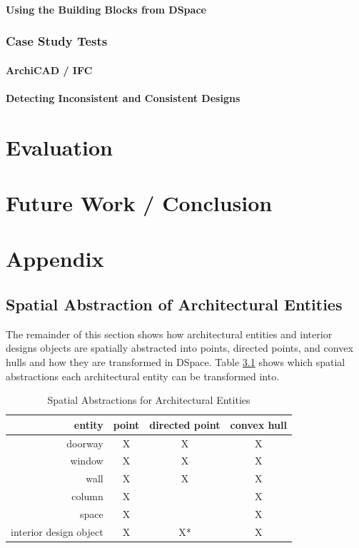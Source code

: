 \documentclass[12pt]{ucthesis}
\begin{document}
\subsubsection{Using the Building Blocks from DSpace}

\subsection{Case Study Tests}

\subsubsection{ArchiCAD / IFC}

\subsubsection{Detecting Inconsistent and Consistent Designs}

\chapter{Evaluation}


\chapter{Future Work / Conclusion}

\appendix
\chapter{Appendix}
\section{Spatial Abstraction of Architectural Entities}
The remainder of this section shows how architectural entities and interior designs objects are spatially abstracted into points, directed points, and convex hulls and how they are transformed in DSpace. Table \ref{spatial abstractions} shows which spatial abstractions each architectural entity can be transformed into. 

\begin{table}[H]
  \begin{center}
  \begin{tabular}{ | r | c | c | c |}
    \hline
    entity & point & directed point & convex hull\\ \hline
    doorway & X & X & X \\ \hline
    window & X & X & X \\ \hline
    wall & X & X & X \\ \hline
    column & X &  & X \\ \hline
    space & X &  & X \\ \hline
    interior design object & X & X* & X \\
    \hline
  \end{tabular}
  \end{center}
\caption{Spatial Abstractions for Architectural Entities}
\label{spatial abstractions}
\end{table} 
\end{document}
